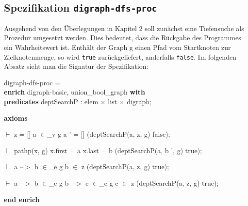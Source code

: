 \subsection{Spezifikation \texttt{digraph-dfs-proc}}
\label{sec:digraph-dfs-proc}

Ausgehend von den Überlegungen in Kapitel 2 soll zunächst eine Tiefensuche als Prozedur umgesetzt werden.
Dies bedeutet, dass die Rückgabe des Programmes ein Wahrheitswert ist. Enthält der Graph g einen Pfad vom Startknoten zur Zielknotenmenge, so
wird \texttt{true} zurückgeliefert, anderfalls \texttt{false}. Im folgenden Absatz sieht man die Signatur der Spezifikation:

digraph-dfs-proc = \\
{\bf enrich} digraph-basic, union\_bool\_graph {\bf with}\+\\
{\bf predicates} deptSearchP  : elem $\times$ list $\times$ digraph;

{\bf axioms}

$\vdash$ z = [] \And a $\in$\_v g \Or a ' = [] \Imp (deptSearchP(a, z, g) \Equiv false);

$\vdash$ pathp(x, g) \And x.first = a \And x.last = b \Imp (deptSearchP(a, b ', g) \Equiv true);

$\vdash$ a --$>$ b $\in$\_e g \And b $\in$ z \Imp (deptSearchP(a, z, g) \Equiv true);

$\vdash$ a --$>$ b $\in$\_e g \And b --$>$ c $\in$\_e g \And c $\in$ z \Imp (deptSearchP(a, z, g) \Equiv true);

{\bf end enrich}

